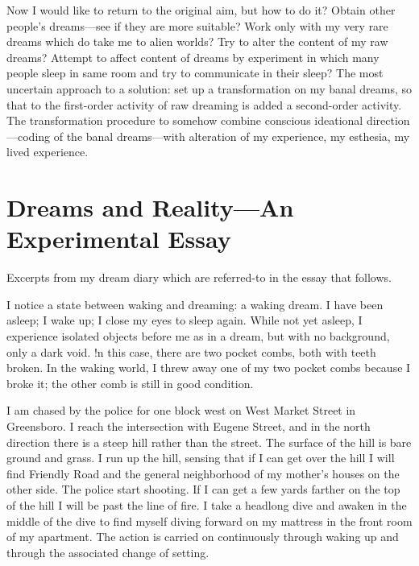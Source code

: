 \documentclass[10pt,twoside,draft]{memoir}
\begin{document}
{{Now I would like to return to the original aim, but how to do it? Obtain 
other people's dreams---see if they are more suitable? Work only with my 
very rare dreams which do take me to alien worlds? Try to alter the content 
of my raw dreams? Attempt to affect content of dreams by experiment in 
which many people sleep in same room and try to communicate in their 
sleep? The most uncertain approach to a solution: set up a transformation 
on my banal dreams, so that to the first-order activity of raw dreaming is 
added a second-order activity. The transformation procedure to somehow 
combine conscious ideational direction---coding of the banal dreams---with 
alteration of my experience, my esthesia, my lived experience. 


\section{Dreams and Reality---An Experimental Essay}

Excerpts from my dream diary which are referred-to in the essay that 
follows. 


I notice a state between waking and dreaming: a waking dream. I have 
been asleep; I wake up; I close my eyes to sleep again. While not yet asleep, I 
experience isolated objects before me as in a dream, but with no 
background, only a dark void. !n this case, there are two pocket combs, both 
with teeth broken. In the waking world, I threw away one of my two pocket 
combs because I broke it; the other comb is still in good condition. 


I am chased by the police for one block west on West Market Street in 
Greensboro. I reach the intersection with Eugene Street, and in the north 
direction there is a steep hill rather than the street. The surface of the hill is 
bare ground and grass. I run up the hill, sensing that if I can get over the hill 
I will find Friendly Road and the general neighborhood of my mother's 
houses on the other side. The police start shooting. If I can get a few yards 
farther on the top of the hill I will be past the line of fire. I take a headlong 
dive and awaken in the middle of the dive to find myself diving forward on 
my mattress in the front room of my apartment. The action is carried on 
continuously through waking up and through the associated change of 
setting. 



}}
\end{document}
